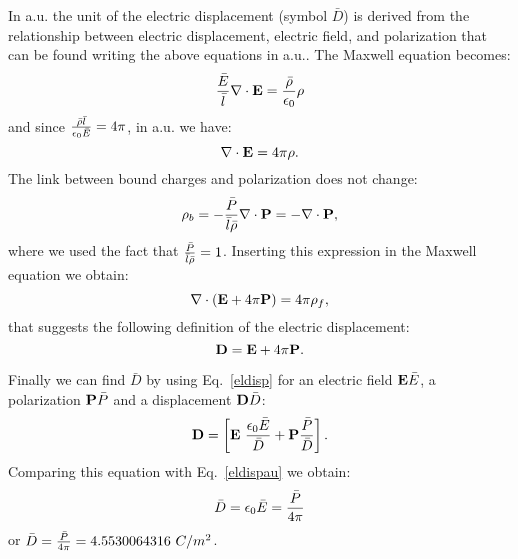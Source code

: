 \documentclass[12pt,a4paper]{article}
\def\bard{4.5530064316}
\begin{document}
{\color{web-blue} In a.u. the unit of the electric displacement 
(symbol $\bar D$) is derived from the 
relationship between electric displacement, electric field, and polarization
that can be found writing the above equations in a.u.. The Maxwell
equation becomes:
\begin{equation}
{\bar E \over \bar l} \nabla \cdot {\bf E} = {\bar \rho \over \epsilon_0}
\rho
\label{maxwell1gen}
\end{equation}
and since ${\bar \rho \bar l \over \epsilon_0 \bar E}=4\pi$, in a.u. we have:
\begin{equation}
\nabla \cdot {\bf E} = 4 \pi \rho.
\end{equation}
The link between bound charges and polarization does not change:
\begin{equation}
\rho_b = -{\bar P \over \bar l \bar \rho} \nabla \cdot {\bf P}=
-\nabla \cdot {\bf P},
\end{equation}
where we used the fact that ${\bar P \over \bar l \bar \rho}=1$.
Inserting this expression in the Maxwell equation we obtain:
\begin{equation}
\nabla \cdot ({\bf E}+ 4 \pi {\bf P})=4 \pi \rho_f, 
\label{aldispau}
\end{equation}
that suggests the following definition of the electric displacement:
\begin{equation}
{\bf D}={\bf E} + 4\pi {\bf P}.
\label{eldispau}
\end{equation}

Finally we can find $\bar D$ by using Eq.~\ref{eldisp} for an electric
field ${\bf E} \bar E$, a polarization ${\bf P} \bar P$ and a
displacement ${\bf D} \bar D$:
\begin{equation}
{\bf D} = \left[{\bf E}\ {\epsilon_0 \bar E\over \bar D} + 
{\bf P} {\bar P\over \bar D}\right].
\label{eldispgen}
\end{equation}
Comparing this equation with Eq.~\ref{eldispau} we obtain:
\begin{equation}
\bar D= {\epsilon_0 \bar E}= {\bar P \over 4 \pi}
\end{equation}
or $\bar D= {\bar P\over 4 \pi}=\bard\ C/m^2$.
\\
}
\end{document}

